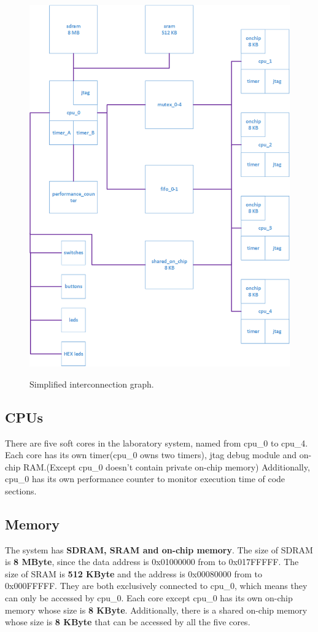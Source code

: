 \documentclass[conference]{IEEEtran}
\begin{document}
\begin{figure}
	\centering
	\includegraphics[scale=0.5]{interconnect.png}
	\label{fig1:SimplifiedInterconnectionGraph}
	\caption{Simplified interconnection graph.}
\end{figure}  
\subsection{CPUs}
There are five soft cores in the laboratory system, named from cpu\_0 to cpu\_4. Each core has its own timer(cpu\_0 owns two timers), jtag debug module and on-chip RAM.(Except cpu\_0 doesn't contain private on-chip memory) Additionally, cpu\_0 has its own performance counter to monitor execution time of code sections.
\subsection{Memory}
The system has \textbf{SDRAM, SRAM and on-chip memory}. The size of SDRAM is \textbf{8 MByte}, since the data address is 0x01000000 from to 0x017FFFFF. The size of SRAM is \textbf{512 KByte} and the address is 0x00080000 from to 0x000FFFFF. They are both exclusively connected to cpu\_0, which means they can only be accessed by cpu\_0. Each core except cpu\_0 has its own on-chip memory whose size is \textbf{8 KByte}. Additionally, there is a shared on-chip memory whose size is \textbf{8 KByte} that can be accessed by all the five cores.
\end{document}
